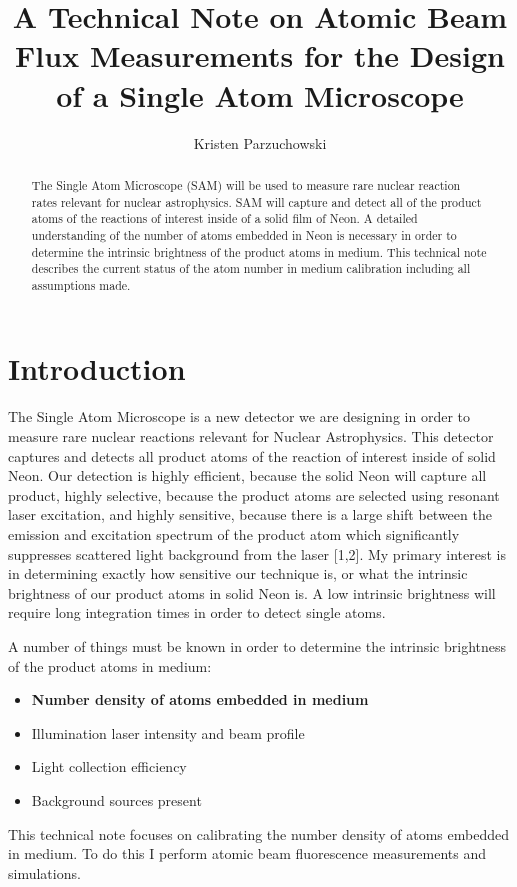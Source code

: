 \documentclass[12pt, a4paper]{article}
\title{A Technical Note on Atomic Beam Flux Measurements for the Design of a Single Atom Microscope}
\author{Kristen Parzuchowski}
\begin{document}
\maketitle
\begin{abstract}
The Single Atom Microscope (SAM) will be used to measure rare nuclear reaction rates relevant for nuclear astrophysics. SAM will capture and detect all of the product atoms of the reactions of interest inside of a solid film of Neon. A detailed understanding of the number of atoms embedded in Neon is necessary in order to determine the intrinsic brightness of the product atoms in medium. This technical note describes the current status of the atom number in medium calibration including all assumptions made.
\end{abstract}
\section{Introduction}
The Single Atom Microscope is a new detector we are designing in order to measure rare nuclear reactions relevant for Nuclear Astrophysics. This detector captures and detects all product atoms of the reaction of interest inside of solid Neon. Our detection is highly efficient, because the solid Neon will capture all product, highly selective, because the product atoms are selected using resonant laser excitation, and highly sensitive, because there is a large shift between the emission and excitation spectrum of the product atom which significantly suppresses scattered light background from the laser [1,2]. My primary interest is in determining exactly how sensitive our technique is, or what the intrinsic brightness of our product atoms in solid Neon is. A low intrinsic brightness will require long integration times in order to detect single atoms. 

A number of things must be known in order to determine the intrinsic brightness of the product atoms in medium:
\begin{itemize}
\item \textbf{Number density of atoms embedded in medium}
\item Illumination laser intensity and beam profile
\item Light collection efficiency
\item Background sources present
\end{itemize}
This technical note focuses on calibrating the number density of atoms embedded in medium. To do this I perform atomic beam fluorescence measurements and simulations. 
\end{document}
